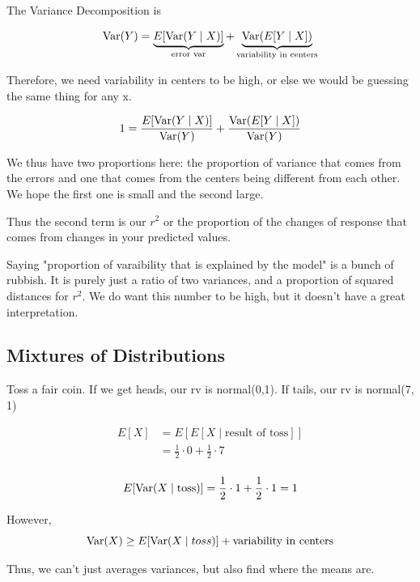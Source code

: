 \documentclass{report}
\begin{document}
The Variance Decomposition is 

\[
	\operatorname{Var}(Y) = \underbrace{E[\operatorname{Var}(Y \mid X)]}_{\text{error var}} + \underbrace{\operatorname{Var}(E[Y \mid X])}_{\text{variability in centers}}
\]

Therefore, we need variability in centers to be high, or else we would be guessing the same thing for any x. 

\[
1 = \frac{E[\operatorname{Var}(Y \mid X)]}{\operatorname{Var}(Y)} + \frac{\operatorname{Var}(E[Y \mid X])}{\operatorname{Var}(Y)}
\]

We thus have two proportions here: the proportion of variance that comes from the errors and one that comes from the centers being different from each other. We hope the first one is small and the second large. 

Thus the second term is our $r^{2}$ or the proportion of the changes of response that comes from changes in your predicted values. 

Saying "proportion of varaibility that is explained by the model" is a bunch of rubbish. It is purely just a ratio of two variances, and  a proportion of squared distances for $r^{2}$. We do want this number to be high, but it doesn't have a great interpretation. 


\subsection{Mixtures of Distributions} 

Toss a fair coin. If we get heads, our rv is normal(0,1). If tails, our rv is normal(7, 1)


\begin{align*}
	E[X] &= E[E[X \mid \text{result of toss}]] \\
	&= \frac{1}{2} \cdot 0 + \frac{1}{2} \cdot 7 \\
\end{align*}


\begin{align*}
	E[\operatorname{Var}(X \mid \text{toss})] &= \frac{1}{2} \cdot 1 + \frac{1}{2} \cdot 1 = 1 \\
\end{align*}

However, 
\[
\operatorname{Var}(X) \ge E[\operatorname{Var}(X \mid toss)] + \text{variability in centers}
\]

Thus, we can't just averages variances, but also find where the means are. 
\end{document}
